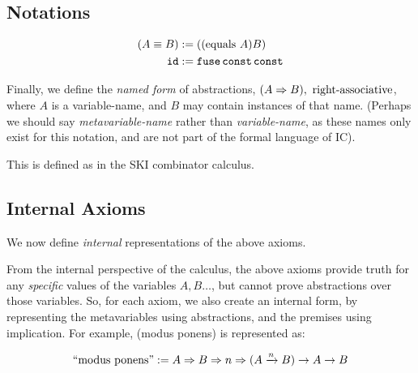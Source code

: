 \documentclass{article}
\begin{document}
  \subsection{Notations}


  \newcommand{\ic}[1]{#1}
  
  

  \begin{align*}
    (A \equiv B) &:= ((\mathrm{equals}\ A) B)\\
    \operatorname{\texttt{id}} &:= \operatorname{\texttt{fuse}} \operatorname{\texttt{const}} \operatorname{\texttt{const}}\\
  \end{align*}

  Finally, we define the \emph{named form} of abstractions, $(\nameabst{A}B),\ \operatorname{right-associative}$, where $A$ is a variable-name, and $B$ may contain instances of that name. (Perhaps we should say \emph{metavariable-name} rather than \emph{variable-name}, as these names only exist for this notation, and are not part of the formal language of IC).
  
  This is defined as in the SKI combinator calculus.

  \subsection{Internal Axioms}

  We now define \emph{internal} representations of the above axioms.

  From the internal perspective of the calculus, the above axioms provide truth for any \emph{specific} values of the variables $A, B\dots$, but cannot prove abstractions over those variables.
  So, for each axiom, we also create an internal form, by representing the metavariables using abstractions, and the premises using implication.
  For example, (modus ponens) is represented as:

  \begin{equation*}
    \mathrm{``modus\ ponens"} := A \Rightarrow B \Rightarrow n \Rightarrow (A \xrightarrow{n} B) \to A \to B
  \end{equation*}
  
\end{document}
